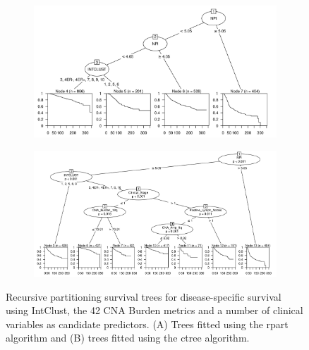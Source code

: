 \begin{figure}[!h]
\centering

\vspace{1cm}

\begin{subfigure}{\textwidth}
\subcaption{}
\includegraphics[width=1\textwidth]{../figures/Chapter_3/Clin_PA_PartyKit_Survival_Burden_DSS_INTCLUST.png}
\end{subfigure}

\vspace{2cm}

\begin{subfigure}{\textwidth}
\subcaption{}
\includegraphics[width=1\textwidth]{../figures/Chapter_3/Clin_PA_Ctree_Survival_Burden_DSS_INTCLUST.png}
\end{subfigure}

\vspace{1cm}

\caption[Recursive partitioning survival trees for disease-specific survival using IntClust, the 42 CNA Burden metrics and a number of clinical variables as candidate predictors.]{Recursive partitioning survival trees for disease-specific survival using IntClust, the 42 CNA Burden metrics and a number of clinical variables as candidate predictors. (A) Trees fitted using the rpart algorithm and (B) trees fitted using the ctree algorithm.}
\label{fig:PA_INTCLUST_CNA_Burden_DSS_Clin}
\end{figure}


